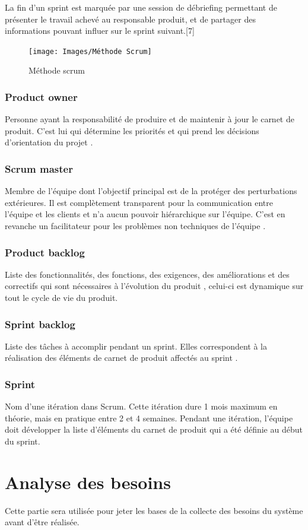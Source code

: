 	
	La fin d’un sprint est marquée par une session de débriefing permettant de présenter le travail achevé au responsable produit, et de partager des informations pouvant influer sur le sprint suivant.[7]
		\begin{figure} [h]
		\begin{center}
			\centering
			\texttt{[image: Images/Méthode Scrum]}
		\end{center}
		\caption{Méthode scrum}
	\end{figure}
	
	\subsubsection{Product owner }
	Personne ayant la responsabilité de produire et de maintenir à jour le carnet de produit. C'est lui qui détermine les priorités et qui prend les décisions d'orientation du projet .
	\subsubsection{Scrum master  }
	Membre de l'équipe dont l'objectif principal est de la protéger des perturbations extérieures. Il est complètement transparent pour la communication entre l'équipe et les clients et n'a aucun pouvoir hiérarchique sur l'équipe. C'est en revanche un facilitateur pour les problèmes non techniques de l'équipe .
	\subsubsection{Product backlog  }
	Liste des fonctionnalités, des fonctions, des exigences, des améliorations et des correctifs qui sont nécessaires à l'évolution du produit , celui-ci est dynamique sur tout le cycle de vie du produit.
	\subsubsection{	Sprint backlog }
	Liste des tâches à accomplir pendant un sprint. Elles correspondent à la réalisation des éléments de carnet de produit affectés au sprint .
	\subsubsection{Sprint }
	Nom d'une itération dans Scrum. Cette itération dure 1 mois maximum en théorie, mais en pratique entre 2 et 4 semaines. Pendant une itération, l'équipe doit développer la liste d'éléments du carnet de produit qui a été définie au début du sprint.
	\section{Analyse des besoins }	
	Cette partie sera utilisée pour jeter les bases de la collecte des besoins du système avant d'être réalisée.
	
